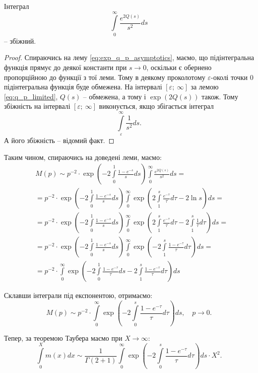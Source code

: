 \begin{lem}
	Інтеграл
	$$
		\int\limits_0^\infty \frac{e^{2Q(s)}}{s^2} ds
	$$
	– збіжний.
\end{lem}
\begin{proof}
	Спираючись на лему \eqref{eq:exp_q_p_asymptotics}, маємо, що підінтегральна функція прямує до деякої константи при $s \rightarrow 0$, оскільки є обернено пропорційною до функції з тої леми. Тому в деякому проколотому $\varepsilon$-околі точки 0 підінтегральна функція буде обмежена. На інтервалі $[\varepsilon; ~\infty]$ за лемою \eqref{eq:q_p_limited}, $Q(s)$ – обмежена, а тому і $\exp(2Q(s))$ також. Тому збіжність на інтервалі $[\varepsilon; ~\infty]$ виконується, якщо збігається інтеграл
	\[
		\int\limits_\varepsilon^\infty \frac{1}{s^2} ds.
	\]
	А його збіжність – відомий факт.
\end{proof}
		
Таким чином, спираючись на доведені леми, маємо:
\begin{align*}
&M(p) \sim p^{-2} \cdot \exp\left(-2\int\limits_0^1 \frac{1-e^{-s}}{s} ds\right) \int\limits_0^\infty \frac{e^{2Q(s)}}{s^2} ds = \\
& = p^{-2} \cdot \exp\left(-2\int\limits_0^1 \frac{1-e^{-s}}{s} ds\right) \int\limits_0^\infty \exp\left(2\int\limits_1^s \frac{e^{-\tau}}{\tau} d\tau - 2 \ln s\right) ds = \\
& = p^{-2} \cdot \exp\left(-2\int\limits_0^1 \frac{1-e^{-s}}{s} ds\right) \int\limits_0^\infty \exp\left(2\int\limits_1^s \frac{e^{-\tau}}{\tau} d\tau - 2  \int\limits_1^s  \frac{1}{\tau} d\tau \right) ds = \\
& = p^{-2} \cdot \exp\left(-2\int\limits_0^1 \frac{1-e^{-s}}{s} ds\right) \int\limits_0^\infty \exp\left(-2\int\limits_1^s \frac{1 - e^{-\tau}}{\tau} d\tau  \right) ds = \\
& = p^{-2} \cdot \int\limits_0^\infty \exp\left( -2\int\limits_0^1 \frac{1-e^{-\tau}}{\tau} ds -2\int\limits_1^s \frac{1 - e^{-\tau}}{\tau} d\tau  \right) ds 
\end{align*}

Склавши інтеграли під експонентою, отримаємо:
\begin{equation}
	M(p) \sim p^{-2} \cdot \int\limits_0^\infty \exp\left( -2\int\limits_0^s \frac{1 - e^{-\tau}}{\tau} d\tau  \right) ds, \quad p \rightarrow 0.
\end{equation}

Тепер, за теоремою Таубера маємо при $X \rightarrow \infty$:
\begin{equation}
	\int\limits_0^X m(x) dx \sim \frac{1}{\Gamma(2 + 1)} \int\limits_0^\infty \exp\left( -2\int\limits_0^s \frac{1 - e^{-\tau}}{\tau} d\tau  \right) ds \cdot X^2.
\end{equation}

